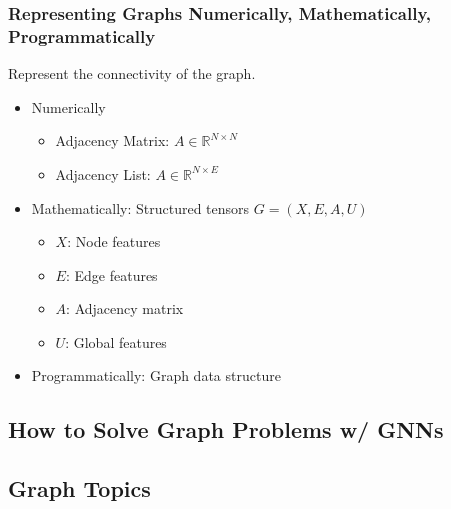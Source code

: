 \subsubsection{Representing Graphs Numerically, Mathematically, Programmatically}
\begin{notes} Represent the connectivity of the graph.
    \begin{itemize}
        \item Numerically 
        \begin{itemize}
            \item Adjacency Matrix: $A \in \mathbb{R}^{N \times N}$
            \item Adjacency List: $A \in \mathbb{R}^{N \times E}$
        \end{itemize}
        \item Mathematically: Structured tensors $G = (X,E,A,U)$
        \begin{itemize}
            \item $X$: Node features
            \item $E$: Edge features
            \item $A$: Adjacency matrix
            \item $U$: Global features
        \end{itemize}
        \item Programmatically: Graph data structure
    \end{itemize}
\end{notes}

\subsection{How to Solve Graph Problems w/ GNNs}

\subsection{Graph Topics}
